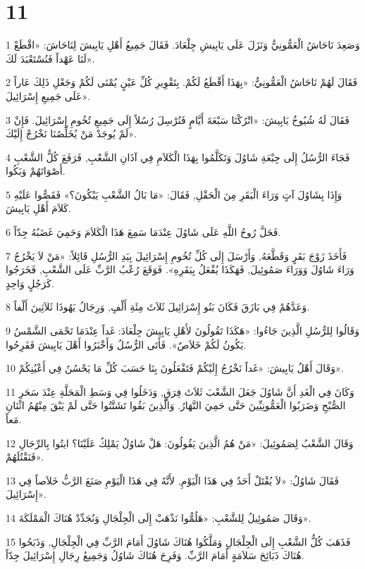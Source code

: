 \chapter{11}

\par 1 وَصَعِدَ نَاحَاشُ الْعَمُّونِيُّ وَنَزَلَ عَلَى يَابِيشِ جِلْعَادَ. فَقَالَ جَمِيعُ أَهْلِ يَابِيشَ لِنَاحَاشَ: «اقْطَعْ لَنَا عَهْداً فَنُسْتَعْبَدَ لَكَ».
\par 2 فَقَالَ لَهُمْ نَاحَاشُ الْعَمُّونِيُّ: «بِهَذَا أَقْطَعُ لَكُمْ. بِتَقْوِيرِ كُلِّ عَيْنٍ يُمْنَى لَكُمْ وَجَعْلِ ذَلِكَ عَاراً عَلَى جَمِيعِ إِسْرَائِيلَ».
\par 3 فَقَالَ لَهُ شُيُوخُ يَابِيشَ: «اتْرُكْنَا سَبْعَةَ أَيَّامٍ فَنُرْسِلَ رُسُلاً إِلَى جَمِيعِ تُخُومِ إِسْرَائِيلَ. فَإِنْ لَمْ يُوجَدْ مَنْ يُخَلِّصُنَا نَخْرُجْ إِلَيْكَ».
\par 4 فَجَاءَ الرُّسُلُ إِلَى جِبْعَةِ شَاوُلَ وَتَكَلَّمُوا بِهَذَا الْكَلاَمِ فِي آذَانِ الشَّعْبِ, فَرَفَعَ كُلُّ الشَّعْبِ أَصْوَاتَهُمْ وَبَكُوا.
\par 5 وَإِذَا بِشَاوُلَ آتٍ وَرَاءَ الْبَقَرِ مِنَ الْحَقْلِ, فَقَالَ: «مَا بَالُ الشَّعْبِ يَبْكُونَ؟» فَقَصُّوا عَلَيْهِ كَلاَمَ أَهْلِ يَابِيشَ.
\par 6 فَحَلَّ رُوحُ اللَّهِ عَلَى شَاوُلَ عِنْدَمَا سَمِعَ هَذَا الْكَلاَمَ وَحَمِيَ غَضَبُهُ جِدّاً.
\par 7 فَأَخَذَ زَوْجَ بَقَرٍ وَقَطَّعَهُ, وَأَرْسَلَ إِلَى كُلِّ تُخُومِ إِسْرَائِيلَ بِيَدِ الرُّسُلِ قَائِلاً: «مَنْ لاَ يَخْرُجُ وَرَاءَ شَاوُلَ وَوَرَاءَ صَمُوئِيلَ, فَهَكَذَا يُفْعَلُ بِبَقَرِهِ». فَوَقَعَ رُعْبُ الرَّبِّ عَلَى الشَّعْبِ, فَخَرَجُوا كَرَجُلٍ وَاحِدٍ.
\par 8 وَعَدَّهُمْ فِي بَازَقَ فَكَانَ بَنُو إِسْرَائِيلَ ثَلاَثَ مِئَةِ أَلْفٍ, وَرِجَالُ يَهُوذَا ثَلاَثِينَ أَلْفاً.
\par 9 وَقَالُوا لِلرُّسُلِ الَّذِينَ جَاءُوا: «هَكَذَا تَقُولُونَ لأَهْلِ يَابِيشَ جِلْعَادَ: غَداً عِنْدَمَا تَحْمَى الشَّمْسُ يَكُونُ لَكُمْ خَلاَصٌ». فَأَتَى الرُّسُلُ وَأَخْبَرُوا أَهْلَ يَابِيشَ فَفَرِحُوا.
\par 10 وَقَالَ أَهْلُ يَابِيشَ: «غَداً نَخْرُجُ إِلَيْكُمْ فَتَفْعَلُونَ بِنَا حَسَبَ كُلِّ مَا يَحْسُنُ فِي أَعْيُنِكُمْ».
\par 11 وَكَانَ فِي الْغَدِ أَنَّ شَاوُلَ جَعَلَ الشَّعْبَ ثَلاَثَ فِرَقٍ, وَدَخَلُوا فِي وَسَطِ الْمَحَلَّةِ عِنْدَ سَحَرِ الصُّبْحِ وَضَرَبُوا الْعَمُّونِيِّينَ حَتَّى حَمِيَ النَّهَارُ. وَالَّذِينَ بَقُوا تَشَتَّتُوا حَتَّى لَمْ يَبْقَ مِنْهُمُ اثْنَانِ مَعاً.
\par 12 وَقَالَ الشَّعْبُ لِصَمُوئِيلَ: «مَنْ هُمُ الَّذِينَ يَقُولُونَ: هَلْ شَاوُلُ يَمْلِكُ عَلَيْنَا؟ ايتُوا بِالرِّجَالِ فَنَقْتُلَهُمْ».
\par 13 فَقَالَ شَاوُلُ: «لاَ يُقْتَلْ أَحَدٌ فِي هَذَا الْيَوْمِ, لأَنَّهُ فِي هَذَا الْيَوْمِ صَنَعَ الرَّبُّ خَلاَصاً فِي إِسْرَائِيلَ».
\par 14 وَقَالَ صَمُوئِيلُ لِلشَّعْبِ: «هَلُمُّوا نَذْهَبْ إِلَى الْجِلْجَالِ وَنُجَدِّدْ هُنَاكَ الْمَمْلَكَةَ».
\par 15 فَذَهَبَ كُلُّ الشَّعْبِ إِلَى الْجِلْجَالِ وَمَلَّكُوا هُنَاكَ شَاوُلَ أَمَامَ الرَّبِّ فِي الْجِلْجَالِ, وَذَبَحُوا هُنَاكَ ذَبَائِحَ سَلاَمَةٍ أَمَامَ الرَّبِّ. وَفَرِحَ هُنَاكَ شَاوُلُ وَجَمِيعُ رِجَالِ إِسْرَائِيلَ جِدّاً.

